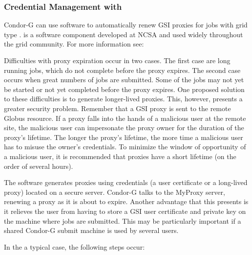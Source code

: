 \subsubsection{\label{sec:My-Proxy}Credential Management with }
Condor-G can use 
software to automatically renew GSI proxies for
 jobs with grid type
.
 is a software component developed at
NCSA and used widely throughout the grid community.
For more information see:

Difficulties with proxy expiration occur in two cases.
The first case are long running jobs, which do not complete
before the proxy expires.
The second case occurs when great numbers of jobs are submitted.
Some of the jobs may not yet be started
or not yet completed before the proxy expires.
One proposed solution to these difficulties is to generate
longer-lived proxies.
This, however, presents a greater security problem.
Remember that a GSI proxy is sent to the remote Globus resource.
If a proxy falls into the hands of a malicious user at the remote site,
the malicious user can impersonate the proxy owner
for the duration of the proxy's lifetime.
The longer the proxy's lifetime,
the more time a malicious user has to misuse the owner's credentials.
To minimize the
window of opportunity of a
malicious user, 
it is recommended that proxies have a short lifetime
(on the order of several hours).

The  software generates proxies using credentials
(a user certificate or a long-lived proxy) located on a secure
 server.
Condor-G talks to the MyProxy server,
renewing a proxy as it is about to expire.
Another advantage that this presents is it relieves the user
from having to store a GSI user certificate and private key
on the machine where jobs are submitted.
This may be particularly important if a shared Condor-G
submit machine is used by several users.

In the a typical case, the following steps occur:

